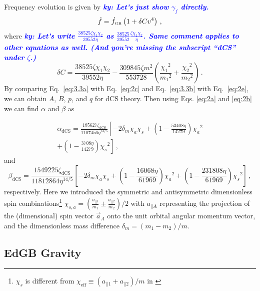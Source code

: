 \documentclass[prd,twocolumn,nofootinbib]{revtex4-1}
\newcommand{\GR}{{\mbox{\tiny GR}}}
\newcommand{\ky}[1]{\textcolor{blue}{\it{\textbf{ky: #1}}} }
\begin{document}
Frequency evolution is given by \cite{Yagi:2012vf} \ky{Let's just show $\gamma_{\dot f}$ directly.}
\begin{equation}\label{eq:3.3b}
\dot{f}=\dot{f}_{\GR}\left(1+\delta C v^4\right)\,,
\end{equation}
 where \ky{Let's write $\frac{38525 \zeta \chi_1 \chi_2}{39552 \eta }$ as $\frac{38525}{39552} \frac{\zeta \chi_1 \chi_2}{\eta}$. Same comment applies to other equations as well. (And you're missing the subscript ``dCS'' under $\zeta$.)}
 \begin{equation}
 \delta C= \frac{38525 \zeta \chi_1 \chi_2}{39552 \eta }-\frac{309845 \zeta  m^2 }{553728 }\left(\frac{{\chi_1}^2}{{m_1}^2}+\frac{{\chi_2}^2}{{m_2}^2}\right)\,.
 \end{equation}
 By comparing Eq.~\eqref{eq:3.3a} with Eq.~\eqref{eq:2c} and Eq.~\eqref{eq:3.3b} with Eq.~\eqref{eq:2e}, we can obtain $A$, $B$, $p$,  and $q$ for dCS theory. Then using Eqs. \eqref{eq:2a} and \eqref{eq:2b} we can find $\alpha$ and $\beta$ as
 
 \begin{align}
 \alpha_{\text{dCS}}=\frac{185627 \zeta_{\text{dCS}} }{1107456 \eta ^{14/5}}\left[-2 \text{$\delta_m$} \text{$\chi_a$} \text{$\chi_s$}+\left(1-\frac{53408 \eta }{14279}\right) \text{$\chi_a$}^2\right. \nonumber\\ \left.+\left(1-\frac{3708 \eta }{14279}\right) \text{$\chi_s$}^2\right]\,,
 \end{align}
 and
 \begin{equation}
 \beta_{\text{dCS}}=\frac{1549225 \zeta_{\text{dCS}} }{11812864 \eta ^{14/5}}\left[-2 \text{$\delta_m$} \text{$\chi_a$} \text{$\chi_s$}+\left(1-\frac{16068 \eta }{61969}\right) \text{$\chi_a$}^2+\left(1-\frac{231808 \eta }{61969}\right) \text{$\chi_s$}^2\right]\,,
 \end{equation}
 respectively. Here we introduced the symmetric and antisymmetric dimensionless spin combinations\footnote{$\chi_s$ is different from $\chi_{\text{eff}}\equiv (a_{||1}+a_{||2})/m$ in \cite{TheLIGOScientific:2016wfe}} $\chi_{s,a}=(\frac{a_{||1}}{m_1}\pm\frac{a_{||2}}{m_2})/2$ with $a_{||A}$ representing the projection of the (dimensional) spin vector $\vec{a}_A$ onto the unit orbital angular momentum vector, and the dimensionless mass difference $\delta_m=(m_1-m_2)/m$.
 
 
  \subsection{EdGB Gravity}
\end{document}
